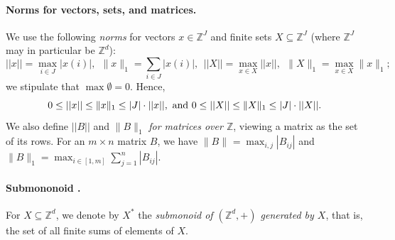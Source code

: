 \documentclass[11pt,a4paper]{amsart}
\newcommand{\nnorm}[1]{||#1||}
\newcommand{\Zset}{\mathbb{Z}}
\newcommand{\setZ}{\Zset}
\newcommand{\norm}[2]{\lVert #2 \rVert_{#1}}
\theoremstyle{plain}
\theoremstyle{definition}
\theoremstyle{defC}
\theoremstyle{thmC}
\begin{document}
\paragraph{Norms for vectors, sets, and matrices.}
We use the following \emph{norms} for vectors $x\in\setZ^J$ and finite sets $X\subseteq\setZ^J$ (where $\setZ^J$ may in particular be $\setZ^d$):
\[
	\nnorm{x}=\max_{i\in J}|x(i)|, \ \ 
	\norm{1}{x}=\sum_{i\in J}|x(i)|, \ \ 
\nnorm{X}=\max_{x\in X}\nnorm{x}, \ \ 
	\norm{1}{X}=\max_{x\in X}\norm{1}{x};
\]
we stipulate that $\max\emptyset=0$.
Hence,
	\[0\leq\nnorm{x}\leq\norm{1}{x}\leq |J|\cdot\nnorm{x},
	{\textnormal{ and }}
0\leq\nnorm{X}\leq\norm{1}{X}\leq |J|\cdot\nnorm{X}.
	\]
We also define $\nnorm{B}$ and $\norm{1}{B}$ \emph{for matrices over
$\setZ$}, viewing a matrix as the set of its rows.
For an $m\times n$ matrix $B$, we have  
$\norm{}{B}=\max_{i,j}|B_{ij}|$ and
 $\norm{1}{B}=\max_{i\in[1,m]}\sum_{j=1}^n|B_{ij}|$.

\paragraph{Submononoid \bm{$X^*$}.} 
For $X\subseteq \setZ^d$, we denote by $X^*$ the \emph{submonoid of $(\setZ^d,+)$ generated by $X$}, that is, the set of all finite sums of elements of $X$.
\end{document}
